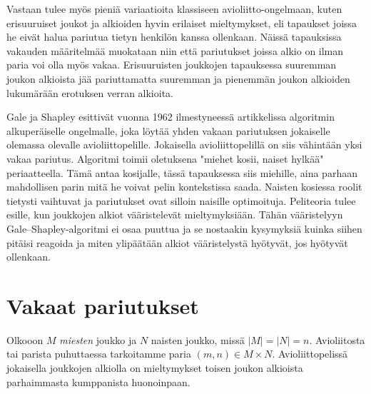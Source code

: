 \documentclass[finnish]{tktltiki2}
\theoremstyle{definition}
\theoremstyle{remark}
\begin{document}
Vastaan tulee myös pieniä variaatioita klassiseen avioliitto-ongelmaan, kuten erisuuruiset joukot ja alkioiden hyvin erilaiset mieltymykset, eli tapaukset joissa he eivät halua pariutua tietyn henkilön kanssa ollenkaan. Näissä tapauksissa vakauden määritelmää muokataan niin että pariutukset joissa alkio on ilman paria voi olla myös vakaa. Erisuuruisten joukkojen tapauksessa suuremman joukon alkioista jää pariuttamatta suuremman ja pienemmän joukon alkioiden lukumärään erotuksen verran alkioita.

Gale ja Shapley esittivät vuonna 1962 ilmestyneessä artikkelissa \cite{gale62a} algoritmin alkuperäiselle ongelmalle, joka löytää yhden vakaan pariutuksen jokaiselle olemassa olevalle avioliittopelille. Jokaisella avioliittopelillä on siis vähintään yksi vakaa pariutus. Algoritmi toimii oletuksena "miehet kosii, naiset hylkää" periaatteella. Tämä antaa kosijalle, tässä tapauksessa siis miehille, aina parhaan mahdollisen parin mitä he voivat pelin kontekstissa saada. Naisten kosiessa roolit tietysti vaihtuvat ja pariutukset ovat silloin naisille optimoituja.
Peliteoria tulee esille, kun joukkojen alkiot vääristelevät mieltymyksiään. Tähän vääristelyyn Gale--Shapley-algoritmi ei osaa puuttua ja se nostaakin kysymyksiä kuinka siihen pitäisi reagoida ja miten ylipäätään alkiot vääristelystä hyötyvät, jos hyötyvät ollenkaan.


\section{Vakaat pariutukset}
Olkooon $M$ \emph{miesten} joukko ja $N$ naisten joukko, missä $|M| = |N| = n$. Avioliitosta tai parista puhuttaessa tarkoitamme paria $(m, n) \in M \times N$. Avioliittopelissä jokaisella joukkojen alkiolla on mieltymykset toisen joukon alkioista parhaimmasta kumppanista huonoinpaan.
\end{document}
